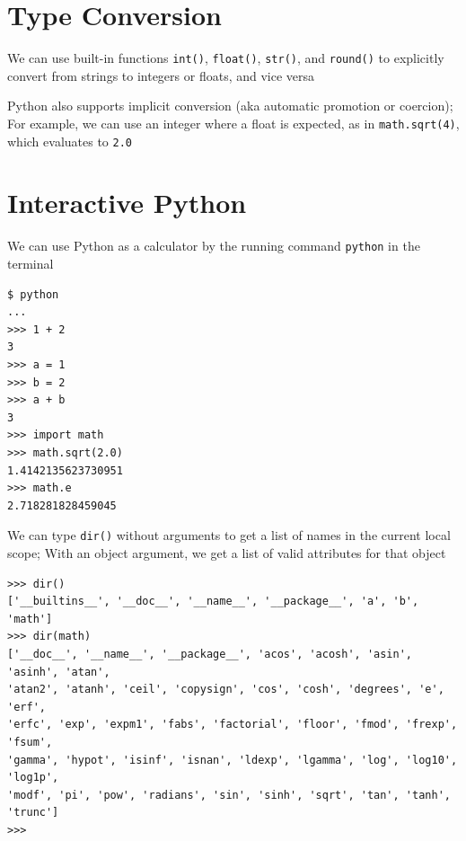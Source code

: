 \documentclass[8pt,a4paper,compress]{beamer}
\begin{document}
\section{Type Conversion}
\begin{frame}[fragile]
\pause

We can use built-in functions \lstinline{int()}, \lstinline{float()}, \lstinline{str()}, and \lstinline{round()} to explicitly convert from strings to integers or floats, and vice versa

\pause
\bigskip

Python also supports implicit conversion (aka automatic promotion or coercion); For example, we can use an integer where a float is expected, as in \lstinline{math.sqrt(4)}, which evaluates to \lstinline{2.0}
\end{frame}

\section{Interactive Python}
\begin{frame}[fragile]
\pause

We can use Python as a calculator by the running command \lstinline{python} in the terminal

\begin{lstlisting}[language={}]
$ python
...
>>> 1 + 2
3
>>> a = 1
>>> b = 2
>>> a + b
3
>>> import math
>>> math.sqrt(2.0)
1.4142135623730951
>>> math.e
2.718281828459045
\end{lstlisting}

\pause
\bigskip

We can type \lstinline{dir()} without arguments to get a list of names in the current local scope; With an object argument, we get a list of valid attributes for that object
\begin{lstlisting}[language={}]
>>> dir()
['__builtins__', '__doc__', '__name__', '__package__', 'a', 'b', 'math']
>>> dir(math)
['__doc__', '__name__', '__package__', 'acos', 'acosh', 'asin', 'asinh', 'atan', 
'atan2', 'atanh', 'ceil', 'copysign', 'cos', 'cosh', 'degrees', 'e', 'erf', 
'erfc', 'exp', 'expm1', 'fabs', 'factorial', 'floor', 'fmod', 'frexp', 'fsum', 
'gamma', 'hypot', 'isinf', 'isnan', 'ldexp', 'lgamma', 'log', 'log10', 'log1p', 
'modf', 'pi', 'pow', 'radians', 'sin', 'sinh', 'sqrt', 'tan', 'tanh', 'trunc']
>>> 
\end{lstlisting}
\end{frame}
\end{document}
